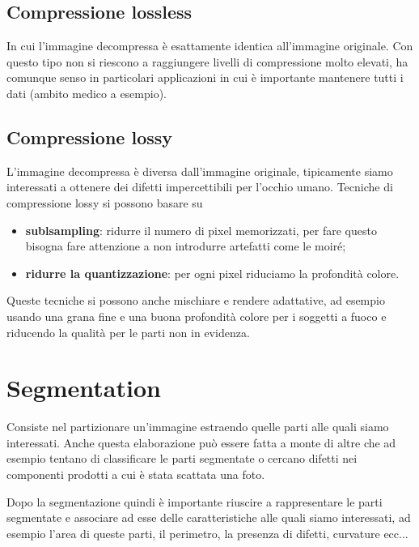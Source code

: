 \subsection{Compressione lossless}
In cui l'immagine decompressa è esattamente identica all'immagine originale. Con questo tipo non si riescono a raggiungere livelli di compressione molto elevati, ha comunque senso in particolari applicazioni in cui è importante mantenere tutti i dati (ambito medico a esempio).
\subsection{Compressione lossy}
L'immagine decompressa è diversa dall'immagine originale, tipicamente siamo interessati a ottenere dei difetti impercettibili per l'occhio umano. Tecniche di compressione lossy si possono basare su
\begin{itemize}
	\item \textbf{sublsampling}: ridurre il numero di pixel memorizzati, per fare questo bisogna fare attenzione a non introdurre artefatti come le moiré;
	\item \textbf{ridurre la quantizzazione}: per ogni pixel riduciamo la profondità colore.
\end{itemize}
Queste tecniche si possono anche mischiare e rendere adattative, ad esempio usando una grana fine e una buona profondità colore per i soggetti a fuoco e riducendo la qualità per le parti non in evidenza.

\section{Segmentation}
Consiste nel partizionare un'immagine estraendo quelle parti alle quali siamo interessati. Anche questa elaborazione può essere fatta a monte di altre che ad esempio tentano di classificare le parti segmentate o cercano difetti nei componenti prodotti a cui è stata scattata una foto.

Dopo la segmentazione quindi è importante riuscire a rappresentare le parti segmentate e associare ad esse delle caratteristiche alle quali siamo interessati, ad esempio l'area di queste parti, il perimetro, la presenza di difetti, curvature ecc...
